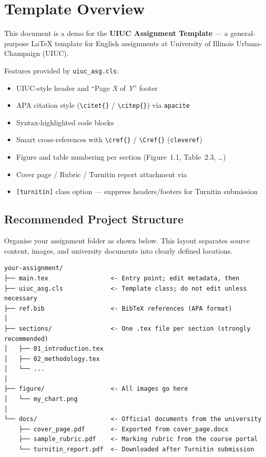 %

\section{Template Overview}

This document is a demo for the \textbf{UIUC Assignment Template} —
a general-purpose \LaTeX{} template for English assignments at University of Illinois Urbana-Champaign (UIUC).

Features provided by \texttt{uiuc\_asg.cls}:

\begin{itemize}
    \item UIUC-style header and ``Page \textit{X} of \textit{Y}'' footer
    \item APA citation style (\verb|\citet{}| / \verb|\citep{}|) via \texttt{apacite}
    \item Syntax-highlighted code blocks
    \item Smart cross-references with \verb|\cref{}| / \verb|\Cref{}| (\texttt{cleveref})
    \item Figure and table numbering per section (Figure~1.1, Table~2.3, \ldots)
    \item Cover page / Rubric / Turnitin report attachment via \verb||
    \item \texttt{[turnitin]} class option — suppress headers/footers for Turnitin submission
\end{itemize}

\subsection{Recommended Project Structure}

Organise your assignment folder as shown below.
This layout separates source content, images, and university documents
into clearly defined locations.

\begin{verbatim}
your-assignment/
├── main.tex                 <- Entry point; edit metadata, then 
├── uiuc_asg.cls             <- Template class; do not edit unless necessary
├── ref.bib                  <- BibTeX references (APA format)
│
├── sections/                <- One .tex file per section (strongly recommended)
│   ├── 01_introduction.tex
│   ├── 02_methodology.tex
│   └── ...
│
├── figure/                  <- All images go here
│   └── my_chart.png
│
└── docs/                    <- Official documents from the university
    ├── cover_page.pdf       <- Exported from cover_page.docx
    ├── sample_rubric.pdf    <- Marking rubric from the course portal
    └── turnitin_report.pdf  <- Downloaded after Turnitin submission
\end{verbatim}

